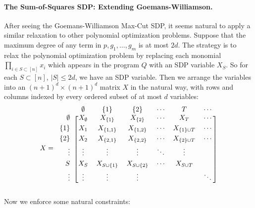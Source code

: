 \documentclass[a4paper,11pt]{article}
\theoremstyle{definition}
\begin{document}
\paragraph{The Sum-of-Squares SDP: Extending Goemans-Williamson.}
After seeing the Goemans-Williamson Max-Cut SDP, it seems natural to apply a similar relaxation to other polynomial optimization problems.
Suppose that the maximum degree of any term in $p, g_1,\ldots,g_m$ is at most $2d$.
The strategy is to relax the polynomial optimization problem by replacing each monomial $\prod_{i\in S \subset [n]} x_i$ which appears in the program $Q$ with an SDP variable $X_S$.
So for each $S \subset [n]$, $|S| \le 2d$, we have an SDP variable.
Then we arrange the variables into an $(n+1)^d \times (n+1)^d$ matrix $X$ in the natural way, with rows and columns indexed by every ordered subset of at most $d$ variables:
\[
X =
\begin{blockarray}{ccccccc}
& \emptyset & \{1\} & \{2\} & \cdots & T & \cdots \\
\begin{block}{r[cccccc]}
\vspace{1mm}
\emptyset & X_{\emptyset} & X_{\{1\}} & X_{\{2\}} & \cdots & X_{T} & \cdots\\
\vspace{1mm}
\{1\} & X_{1} & X_{\{1,1\}} & X_{\{1,2\}} & \cdots & X_{\{1\} \cup T} & \cdots \\
\vspace{1mm}
\{2\} & X_{2} & X_{\{2,1\}} & X_{\{2,2\}} & \cdots & X_{\{2\}\cup T} &  \cdots \\
\vspace{1mm}
\vdots & \vdots & \vdots& \vdots & \ddots  & \vdots & \\
\vspace{1mm}
S & X_{S} & X_{S\cup \{1\}} & X_{S\cup \{2\}} & \cdots & X_{S\cup T} & \\
\vspace{1mm}
\vdots & \vdots & \vdots& \vdots& & & \ddots \\
\end{block}
\end{blockarray}
\]
Now we enforce some natural constraints:
\end{document}
